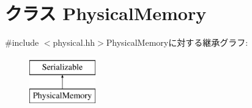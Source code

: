 \hypertarget{classPhysicalMemory}{
\section{クラス PhysicalMemory}
\label{classPhysicalMemory}
}


{\ttfamily \#include $<$physical.hh$>$}PhysicalMemoryに対する継承グラフ:\begin{figure}[H]
\begin{center}
\leavevmode
\includegraphics[height=2cm]{classPhysicalMemory}
\end{center}
\end{figure}
